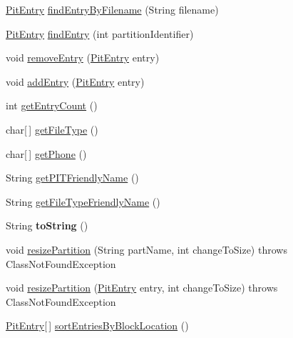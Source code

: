 \begin{DoxyCompactItemize}
\item 
\hyperlink{classcom_1_1casual__dev_1_1libpit_x_1_1_pit_entry}{Pit\-Entry} \hyperlink{classcom_1_1casual__dev_1_1libpit_x_1_1_pit_data_a92fe9be410bfcab61b10c29f659f24d6}{find\-Entry\-By\-Filename} (String filename)
\item 
\hyperlink{classcom_1_1casual__dev_1_1libpit_x_1_1_pit_entry}{Pit\-Entry} \hyperlink{classcom_1_1casual__dev_1_1libpit_x_1_1_pit_data_ac5502e3ad38ca61f482cbe7ade874c51}{find\-Entry} (int partition\-Identifier)
\item 
void \hyperlink{classcom_1_1casual__dev_1_1libpit_x_1_1_pit_data_a5280856fe2d4817ef119bc0254930a14}{remove\-Entry} (\hyperlink{classcom_1_1casual__dev_1_1libpit_x_1_1_pit_entry}{Pit\-Entry} entry)
\item 
void \hyperlink{classcom_1_1casual__dev_1_1libpit_x_1_1_pit_data_a9f10527e6928cb25b762774385d3513f}{add\-Entry} (\hyperlink{classcom_1_1casual__dev_1_1libpit_x_1_1_pit_entry}{Pit\-Entry} entry)
\item 
int \hyperlink{classcom_1_1casual__dev_1_1libpit_x_1_1_pit_data_a2dd3520851fa62dc5cf1e074e8cd8082}{get\-Entry\-Count} ()
\item 
char\mbox{[}$\,$\mbox{]} \hyperlink{classcom_1_1casual__dev_1_1libpit_x_1_1_pit_data_a2a8a3240829d811fd2634d06d7e8158c}{get\-File\-Type} ()
\item 
char\mbox{[}$\,$\mbox{]} \hyperlink{classcom_1_1casual__dev_1_1libpit_x_1_1_pit_data_a7105805f388f6f876910a3c58e3148e0}{get\-Phone} ()
\item 
String \hyperlink{classcom_1_1casual__dev_1_1libpit_x_1_1_pit_data_a05973f518f916ba846d60d7ea9228d41}{get\-P\-I\-T\-Friendly\-Name} ()
\item 
String \hyperlink{classcom_1_1casual__dev_1_1libpit_x_1_1_pit_data_a5ecb1b13b460a24dce7299f88ad75d71}{get\-File\-Type\-Friendly\-Name} ()
\item 
\hypertarget{classcom_1_1casual__dev_1_1libpit_x_1_1_pit_data_af38169ec50287b7b538e8c0729fb94fc}{String {\bfseries to\-String} ()}\label{classcom_1_1casual__dev_1_1libpit_x_1_1_pit_data_af38169ec50287b7b538e8c0729fb94fc}

\item 
void \hyperlink{classcom_1_1casual__dev_1_1libpit_x_1_1_pit_data_aad39835f8390bdc591ae279f4ca5407f}{resize\-Partition} (String part\-Name, int change\-To\-Size)  throws Class\-Not\-Found\-Exception 
\item 
void \hyperlink{classcom_1_1casual__dev_1_1libpit_x_1_1_pit_data_ac7f1ada6723e5aba2c8042776f702b46}{resize\-Partition} (\hyperlink{classcom_1_1casual__dev_1_1libpit_x_1_1_pit_entry}{Pit\-Entry} entry, int change\-To\-Size)  throws Class\-Not\-Found\-Exception 
\item 
\hyperlink{classcom_1_1casual__dev_1_1libpit_x_1_1_pit_entry}{Pit\-Entry}\mbox{[}$\,$\mbox{]} \hyperlink{classcom_1_1casual__dev_1_1libpit_x_1_1_pit_data_a3af0617758de6442f87c50b1a8abfa1d}{sort\-Entries\-By\-Block\-Location} ()
\end{DoxyCompactItemize}
